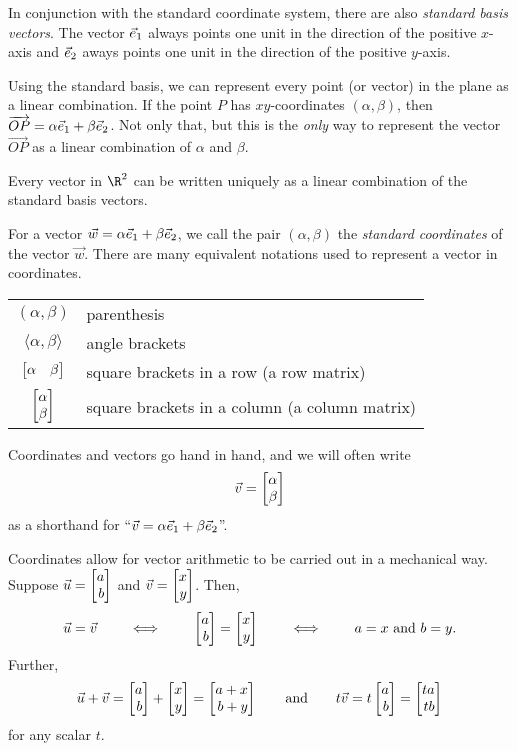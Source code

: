 In conjunction with the standard coordinate system, there are also \emph{standard basis vectors}.
The vector ${\vec e_1}$ always points one unit in the direction of the positive $x$-axis and ${\vec e_2}$
aways points one unit in the direction of the positive $y$-axis.

Using the standard basis, we can represent every point (or vector) in the plane 
as a linear combination. If the point $P$ has $xy$-coordinates $(\alpha,\beta)$, then
$\overrightarrow{OP}=\alpha{\vec e_1}+\beta{\vec e_2}$. Not only that, but this is the
\emph{only} way to represent the vector $\overrightarrow{OP}$ as a linear combination of
$\alpha$ and $\beta$.

\begin{emphbox}[Takeaway]
	Every vector in $\R^2$ can be written uniquely as a linear combination of the standard basis vectors.
\end{emphbox}

For a vector $\vec w=\alpha{\vec e_1}+\beta{\vec e_2}$,
we call the pair $(\alpha,\beta)$  the
\emph{standard coordinates} of the vector $\vec w$.  There
are many equivalent notations used to represent a vector in coordinates.
\begin{center}
	\begin{tabular}{c p{7cm}}
		$(\alpha,\beta)$ & parenthesis\\
		$\langle \alpha,\beta\rangle$ & angle brackets\\
		$\mat{\alpha&\beta}$ & square brackets in a row (a row matrix)\\
		$\mat{\alpha\\\beta}$ & square brackets in a column (a column matrix)\\
	\end{tabular}
\end{center}

Coordinates and vectors go hand in hand, and we will often write
\[
	\vec v=\mat{\alpha\\\beta}
\]
as a shorthand for ``$\vec v=\alpha{\vec e_1}+\beta{\vec e_2}$''.


Coordinates allow for vector arithmetic to be carried out in a mechanical way.
 Suppose $\vec u=\mat{a\\b}$ and $\vec v=\mat{x\\y}$.
Then,
\[
	\vec u=\vec v\qquad\iff\qquad \mat{a\\b}=\mat{x\\y}\qquad\iff\qquad a=x\text{ and }b=y.
\]
Further,
\[
	\vec u+\vec v=\mat{a\\b}+\mat{x\\y}=\mat{a+x\\b+y}\qquad\text{and}\qquad t\vec v=t\mat{a\\b}=\mat{ta\\tb}
\]
for any scalar $t$.


